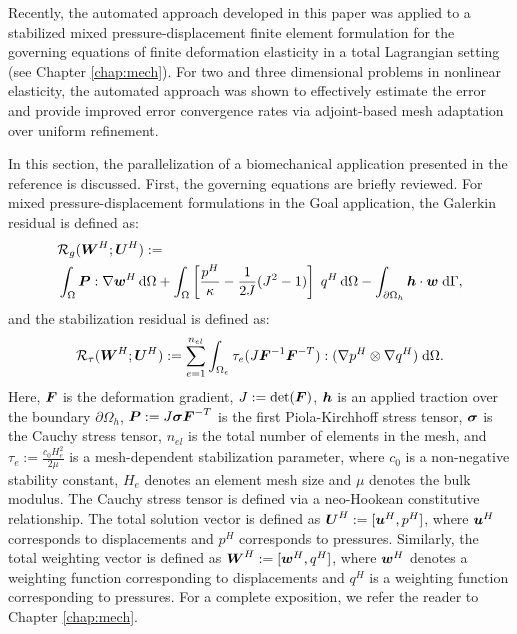 Recently, the automated approach developed in this paper was applied
to a stabilized mixed pressure-displacement finite element formulation
\cite{ramesh2005stabilized} for the governing equations of finite
deformation elasticity in a total Lagrangian setting
\cite{granzow2017adjoint} (see Chapter \ref{chap:mech}).
For two and three dimensional problems in
nonlinear elasticity, the automated approach was shown to effectively
estimate the error and provide improved error convergence rates via
adjoint-based mesh adaptation over uniform refinement.

In this section, the parallelization of a biomechanical application
presented in the reference \cite{granzow2017adjoint} is discussed. First,
the governing equations are briefly reviewed. For mixed pressure-displacement
formulations in the Goal application, the Galerkin residual is
defined as:
%
\begin{gather}
\begin{aligned}
&\mathcal{R}_g(\boldsymbol{W}^H ; \boldsymbol{U}^H) := \\
&\int_{\Omega} \boldsymbol{P} : \nabla \boldsymbol{w}^H \, \text{d} \Omega +
\int_{\Omega} \left[ \frac{p^H}{\kappa} - \frac{1}{2 J}(J^2 - 1) \right] \;
q^H \, \text{d} \Omega -
\int_{\partial \Omega_h} \boldsymbol{h} \cdot \boldsymbol{w} \; \text{d} \Gamma,
\end{aligned}
\label{aut:mech_galerkin}
\end{gather}
%
and the stabilization residual is defined as:
%
\begin{gather}
\mathcal{R}_{\tau}(\boldsymbol{W}^H ; \boldsymbol{U}^H) :=
\sum_{e=1}^{n_{el}} \int_{\Omega_e} \tau_e
(J \boldsymbol{F}^{-1} \boldsymbol{F}^{-T}) : (\nabla p^H \otimes \nabla q^H) \;
\text{d} \Omega.
\label{aut_mech_stabilized}
\end{gather}
%
Here, $\boldsymbol{F}$ is the deformation gradient, $J := \text{det}(\boldsymbol{F})$,
$\boldsymbol{h}$ is an applied traction over the boundary $\partial \Omega_h$,
$\boldsymbol{P} := J \boldsymbol{\sigma} \boldsymbol{F}^{-T}$ is the first Piola-Kirchhoff
stress tensor, $\boldsymbol{\sigma}$ is the Cauchy stress tensor, $n_{el}$
is the total number of elements in the mesh, and $\tau_e :=
\frac{c_0 H_e^2}{2 \mu}$ is a mesh-dependent stabilization parameter,
where $c_0$ is a non-negative stability constant, $H_e$ denotes an
element mesh size and $\mu$ denotes the bulk modulus.
The Cauchy stress tensor is defined via a neo-Hookean constitutive
relationship.  The total
solution vector is defined as $\boldsymbol{U}^H := [\boldsymbol{u}^H, p^H]$, where
$\boldsymbol{u}^H$ corresponds to displacements and $p^H$ corresponds to
pressures. Similarly, the total weighting vector is defined as
$\boldsymbol{W}^H := [\boldsymbol{w}^H, q^H]$, where $\boldsymbol{w}^H$ denotes a weighting
function corresponding to displacements and $q^H$ is a weighting
function corresponding to pressures. For a complete
exposition, we refer the reader to Chapter \ref{chap:mech}.

